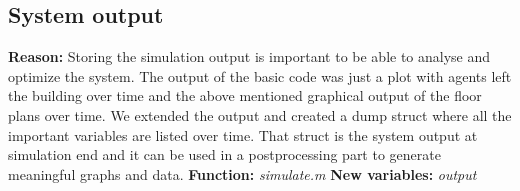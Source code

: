 \documentclass[11pt]{article}
\begin{document}

\subsection{System output}
\textbf{Reason:}
\newline
Storing the simulation output is important to be able to analyse and optimize the system. The output of the basic code was just a plot with agents left the building over time and the above mentioned graphical output of the floor plans over time. We extended the output and created a dump struct where all the important variables are listed over time. That struct is the system output at simulation end and it can be used in a postprocessing part to generate meaningful graphs and data.
\newline
\textbf{Function:}
\newline
\textit{simulate.m}
\newline
\textbf{New variables:}
\newline
\textit{output}
\newline
%
\end{document}
